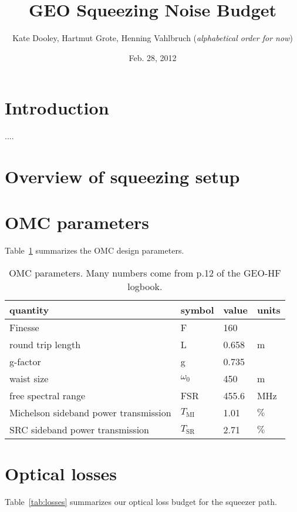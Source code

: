 \documentclass{ligodoc}
\title{GEO Squeezing Noise Budget}
\author{Kate Dooley, Hartmut Grote, Henning Vahlbruch (\emph{alphabetical order for now})}
\date{Feb. 28, 2012}
\newcommand{\micro}{\textmu{}}
\begin{document}
\section{Introduction}
....


\section{Overview of squeezing setup}



\section{OMC parameters}
Table~\ref{tab:OMCparams} summarizes the OMC design parameters.

\begin{table}
\centering
\caption{OMC parameters. Many numbers come from p.12 of the GEO-HF logbook.}
\begin{tabular}{l l l l} %
\hline
quantity & symbol & value & units \\
\hline
Finesse & F & 160 & \\
round trip length & L & 0.658 & m \\
g-factor & g & 0.735 & \\
waist size & $\omega_0$ & 450 & \micro m \\
free spectral range & FSR & 455.6 & MHz \\
Michelson sideband power transmission & $T_{\mathrm{MI}}$ & 1.01 & $\%$ \\
SRC sideband power transmission & $T_{\mathrm{SR}}$ & 2.71 & $\%$ \\
\hline
\end{tabular}
\label{tab:OMCparams}
\end{table}



\section{Optical losses}
Table~\ref{tab:losses} summarizes our optical loss budget for the
squeezer path.
\end{document}
